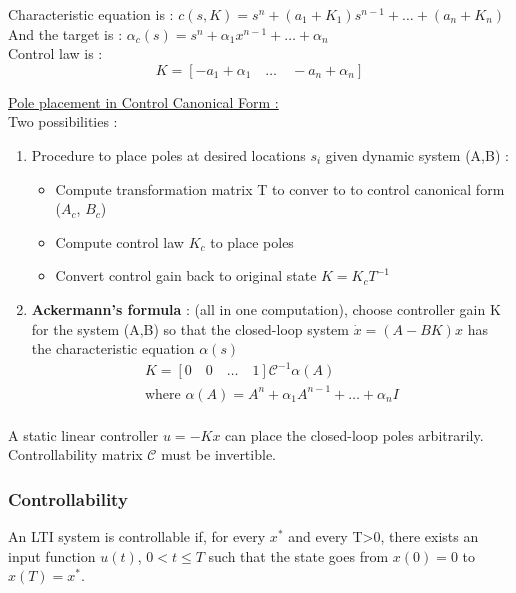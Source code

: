 \documentclass[../main.tex]{subfiles}
\begin{document}
Characteristic equation is : $c(s,K) = s^n + (a_1 + K_1)s^{n-1} + \dots + (a_n + K_n)$\\
And the target is : $\alpha_c(s) = s^n + \alpha_1 x^{n-1} + \dots + \alpha_n$\\

Control law is : \begin{equation}
    K = [-a_1 + \alpha_1 \quad \dots \quad -a_n + \alpha_n]
\end{equation}

\quad \underline{Pole placement in Control Canonical Form :}\\
Two possibilities : \begin{enumerate}
    \item Procedure to place poles at desired locations $s_i$ given dynamic system (A,B) : \begin{itemize}
        \item Compute transformation matrix T to conver to to control canonical form ($A_c$, $B_c$)\\
        \item Compute control law $K_c$ to place poles\\
        \item Convert control gain back to original state $K = K_c T^{-1}$\\
    \end{itemize}
    \item \textbf{Ackermann's formula} : (all in one computation), choose controller gain K for the system (A,B) so that the closed-loop system $\dot{x} = (A-BK)x$ has the characteristic equation $\alpha(s)$ \begin{equation}
        \begin{gathered}
            K = [0\quad 0 \quad \dots \quad 1] \mathcal{C}^{-1} \alpha(A)\\
            \text{where } \alpha(A) = A^n + \alpha_1 A^{n-1} + \dots + \alpha_n I\\
        \end{gathered}
    \end{equation}
\end{enumerate}

A static linear controller $u=-Kx$ can place the closed-loop poles arbitrarily. Controllability matrix $\mathcal{C}$ must be invertible.\\

\subsubsection{Controllability}
An LTI system is controllable if, for every $x^*$ and every T>0, there exists an input function $u(t)$, $0<t\leq T$ such that the state goes from $x(0)=0$ to $x(T)=x^*$.\\
\end{document}
